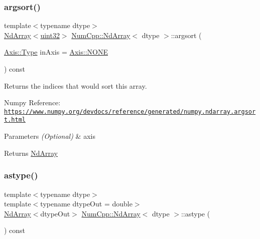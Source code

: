 \subsubsection{\texorpdfstring{argsort()}{argsort()}}
{\footnotesize\ttfamily template$<$typename dtype$>$ \\
\mbox{\hyperlink{class_num_cpp_1_1_nd_array}{Nd\+Array}}$<$\mbox{\hyperlink{namespace_num_cpp_a36f388e948380413c63011cab9b7fbd5}{uint32}}$>$ \mbox{\hyperlink{class_num_cpp_1_1_nd_array}{Num\+Cpp\+::\+Nd\+Array}}$<$ dtype $>$\+::argsort (\begin{DoxyParamCaption}\item[{\mbox{\hyperlink{struct_num_cpp_1_1_axis_ac10eb76f8631762d9ed70c40c42ca6cb}{Axis\+::\+Type}}}]{in\+Axis = {\ttfamily \mbox{\hyperlink{struct_num_cpp_1_1_axis_ac10eb76f8631762d9ed70c40c42ca6cba747ae657022cca1d87702b56d0c038e9}{Axis\+::\+N\+O\+NE}}} }\end{DoxyParamCaption}) const\hspace{0.3cm}{\ttfamily [inline]}}

Returns the indices that would sort this array.

Numpy Reference\+: \href{https://www.numpy.org/devdocs/reference/generated/numpy.ndarray.argsort.html}{\tt https\+://www.\+numpy.\+org/devdocs/reference/generated/numpy.\+ndarray.\+argsort.\+html}


\begin{DoxyParams}{Parameters}
{\em (\+Optional)} & axis \\
\hline
\end{DoxyParams}
\begin{DoxyReturn}{Returns}
\mbox{\hyperlink{class_num_cpp_1_1_nd_array}{Nd\+Array}} 
\end{DoxyReturn}
\mbox{\label{class_num_cpp_1_1_nd_array_a1df09cc9c8f9d3853487562f72ebd0ed}} 
\subsubsection{\texorpdfstring{astype()}{astype()}}
{\footnotesize\ttfamily template$<$typename dtype$>$ \\
template$<$typename dtype\+Out  = double$>$ \\
\mbox{\hyperlink{class_num_cpp_1_1_nd_array}{Nd\+Array}}$<$dtype\+Out$>$ \mbox{\hyperlink{class_num_cpp_1_1_nd_array}{Num\+Cpp\+::\+Nd\+Array}}$<$ dtype $>$\+::astype (\begin{DoxyParamCaption}{ }\end{DoxyParamCaption}) const\hspace{0.3cm}{\ttfamily [inline]}}

